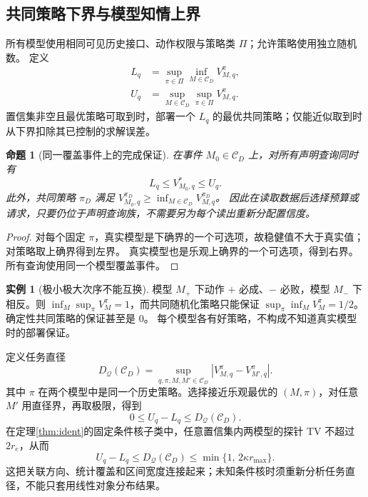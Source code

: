 \documentclass[11pt,a4paper,fontset=fandol]{ctexart}
\newtheorem{proposition}[theorem]{命题}
\theoremstyle{definition}
\newtheorem{example}[theorem]{实例}
\theoremstyle{remark}
\numberwithin{equation}{section}
\begin{document}
\subsection{共同策略下界与模型知情上界}
所有模型使用相同可见历史接口、动作权限与策略类 $\Pi$；允许策略使用独立随机数。
定义
\begin{align}
 L_q&=\sup_{\pi\in\Pi}\inf_{M\in\mathcal C_D}V_{M,q}^{\pi},\\
 U_q&=\sup_{M\in\mathcal C_D}\sup_{\pi\in\Pi}V_{M,q}^{\pi}.
 \label{eq:robust}
\end{align}
置信集非空且最优策略可取到时，部署一个 $L_q$ 的最优共同策略；仅能近似取到时从下界扣除其已控制的求解误差。

\begin{proposition}[同一覆盖事件上的完成保证]
\label{prop:certificate}
在事件 $M_0\in\mathcal C_D$ 上，对所有声明查询同时有
\[
 L_q\le V_{M_0,q}^{*}\le U_q.
\]
此外，共同策略 $\pi_D$ 满足
$V_{M_0,q}^{\pi_D}\ge\inf_{M\in\mathcal C_D}V_{M,q}^{\pi_D}$。
因此在读取数据后选择预算或请求，只要仍位于声明查询族，不需要另为每个读出重新分配置信度。
\end{proposition}
\begin{proof}
对每个固定 $\pi$，真实模型是下确界的一个可选项，故稳健值不大于真实值；对策略取上确界得到左界。
真实模型也是乐观上确界的一个可选项，得到右界。所有查询使用同一个模型覆盖事件。
\end{proof}

\begin{example}[极小极大次序不能互换]
模型 $M_+$ 下动作 $+$ 必成、$-$ 必败，模型 $M_-$ 下相反。则
$\inf_M\sup_\pi V_M^\pi=1$，而共同随机化策略只能保证
$\sup_\pi\inf_MV_M^\pi=1/2$。确定性共同策略的保证甚至是 $0$。
每个模型各有好策略，不构成不知道真实模型时的部署保证。
\end{example}

定义任务直径
\[
 D_{\mathcal Q}(\mathcal C_D)=
 \sup_{q,\pi,M,M'\in\mathcal C_D}|V_{M,q}^{\pi}-V_{M',q}^{\pi}|.
\]
其中 $\pi$ 在两个模型中是同一个历史策略。选择接近乐观最优的 $(M,\pi)$，对任意 $M'$ 用直径界，再取极限，得到
\begin{equation}
 0\le U_q-L_q\le D_{\mathcal Q}(\mathcal C_D).
 \label{eq:diameter}
\end{equation}
在定理\ref{thm:ident}的固定条件核子类中，任意置信集内两模型的探针 TV 不超过 $2r_e$，从而
\begin{equation}
 \boxed{U_q-L_q\le D_{\mathcal Q}(\mathcal C_D)
 \le\min\{1,\,2\kappa r_{\max}\}.}
 \label{eq:width}
\end{equation}
这把关联方向、统计覆盖和区间宽度连接起来；未知条件核时须重新分析任务直径，不能只套用线性对象分布结果。
\end{document}
